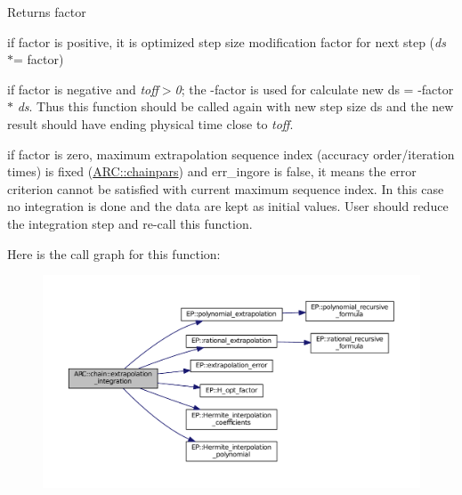 \begin{DoxyReturn}{Returns}
factor
\begin{DoxyItemize}
\item if factor is positive, it is optimized step size modification factor for next step ({\itshape ds} $\ast$= factor)
\item if factor is negative and {\itshape toff$>$0}; the -\/factor is used for calculate new ds\textquotesingle{} = -\/factor $\ast$ {\itshape ds}. Thus this function should be called again with new step size ds\textquotesingle{} and the new result should have ending physical time close to {\itshape toff}.
\item if factor is zero, maximum extrapolation sequence index (accuracy order/iteration times) is fixed (\hyperlink{classARC_1_1chainpars}{A\+R\+C\+::chainpars}) and err\+\_\+ingore is false, it means the error criterion cannot be satisfied with current maximum sequence index. In this case no integration is done and the data are kept as initial values. User should reduce the integration step and re-\/call this function. 
\end{DoxyItemize}
\end{DoxyReturn}


Here is the call graph for this function\+:\nopagebreak
\begin{figure}[H]
\begin{center}
\leavevmode
\includegraphics[width=350pt]{classARC_1_1chain_af8f59f60d18fff66ef7102a74b4a8838_cgraph}
\end{center}
\end{figure}


